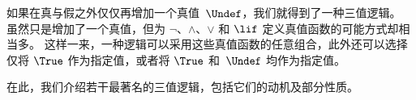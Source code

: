 \documentclass[../../../include/open-logic-section]{subfiles}
\begin{document}


如果在真与假之外仅仅再增加一个真值~$\Undef$，我们就得到了一种三值逻辑。
虽然只是增加了一个真值，但为 $\lnot$、$\land$、$\lor$ 和 $\lif$ 定义真值函数的可能方式却相当多。
这样一来，一种逻辑可以采用这些真值函数的任意组合，此外还可以选择仅将 $\True$ 作为指定值，或者将 $\True$ 和~$\Undef$ 均作为指定值。

在此，我们介绍若干最著名的三值逻辑，包括它们的动机及部分性质。
\end{document}
